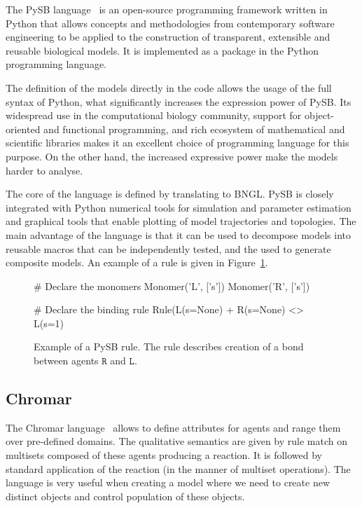 \documentclass[11pt,a4paper]{report}
\begin{document}
The PySB language~\cite{Lopez646} is an open-source programming framework written in Python that allows concepts and methodologies from contemporary software engineering to be applied to the construction of transparent, extensible and reusable biological  models. It is implemented as a package in the Python programming language. 

The definition of the models directly in the code allows the usage of the full syntax of Python, what significantly increases the expression power of PySB. Its widespread use in the computational biology community, support for object-oriented and functional programming, and rich ecosystem of mathematical and scientific libraries makes it an excellent choice of programming language for this purpose. On the other hand, the increased expressive power make the models harder to analyse.

The core of the language is defined by translating to BNGL. PySB is closely integrated with Python numerical tools for simulation and parameter estimation and graphical tools that enable plotting of model trajectories and topologies. The main advantage of the language is that it can be used to decompose models into reusable macros that can be independently tested, and the used to generate composite models. An example of a rule is given in Figure~\ref{pysb_rule}.

\begin{figure}[!h]
\begin{center}
\begin{python}
# Declare the monomers
Monomer('L', ['s'])
Monomer('R', ['s'])

# Declare the binding rule
Rule(L(s=None) + R(s=None) <> L(s=1) %
\end{python}
\end{center}
\caption{Example of a PySB rule. The rule describes creation of a bond between agents $\mathtt{R}$ and $\mathtt{L}$.}\label{PySB-rule}\label{pysb_rule}
\end{figure}

\subsection{Chromar}

The Chromar language~\cite{honorato2017chromar} allows to define attributes for agents and range them over pre-defined domains. The qualitative semantics are given by rule match on multisets composed of these agents producing a reaction. It is followed by standard application of the reaction (in the manner of multiset operations). The language is very useful when creating a model where we need to create new distinct objects and control population of these objects.
\end{document}
